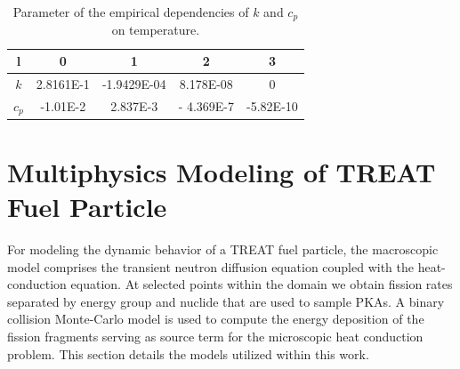 \documentclass{anstrans}
\begin{document}

\begin{table}[t]
\centering
\caption{Parameter of the empirical dependencies of $k$ and $c_p$ on temperature. \label{tab:k_cp_parameter}}
\begin{tabular}{ccccc}
\toprule
l & 0 & 1 & 2 & 3 \\
\midrule
$k$ &  2.8161E-1 &-1.9429E-04& 8.178E-08&0 \\
$c_p$ &-1.01E-2 &2.837E-3 & - 4.369E-7 & -5.82E-10 \\
\bottomrule
\end{tabular}
\end{table}

\section{Multiphysics Modeling of TREAT Fuel Particle}
For modeling the dynamic behavior of a TREAT fuel particle, the macroscopic model comprises the transient neutron diffusion equation coupled with the heat-conduction equation. At selected points within the domain we obtain fission rates separated by energy group and nuclide that are used to sample PKAs. A binary collision Monte-Carlo model  is used to compute the energy deposition of the fission fragments serving as source term for the microscopic heat conduction problem. This section details the models utilized within this work.
\end{document}
